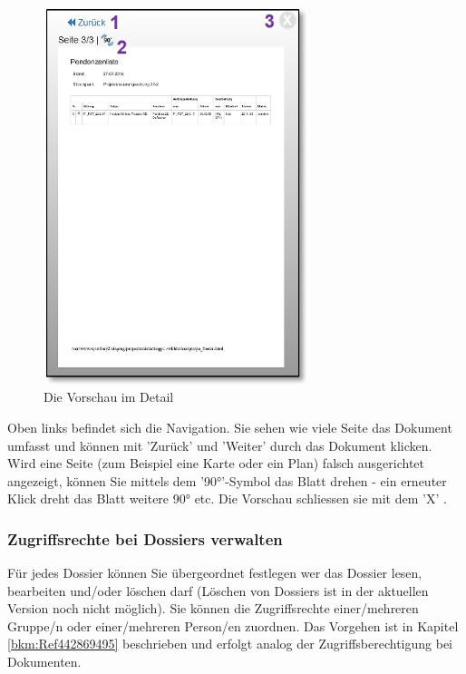 \begin{figure}   %
  \vspace{-30pt}      %
  \begin{center}
    \includegraphics[height=110mm]{../chapters/11_Dokumentenablage/pictures/11-1-2_VorschauDetails.jpg}
  \end{center}
  \vspace{-20pt}
  \caption{Die Vorschau im Detail}
  \vspace{-10pt}
\end{figure}
Oben links befindet sich die Navigation. Sie sehen wie viele Seite das Dokument umfasst und können mit 'Zurück' und 'Weiter'  durch das Dokument klicken. Wird eine Seite (zum Beispiel eine Karte oder ein Plan) falsch ausgerichtet angezeigt, können Sie mittels dem '90°'-Symbol das Blatt drehen - ein erneuter Klick dreht das Blatt weitere 90° etc. Die Vorschau schliessen sie mit dem 'X' .

\vspace{5cm}

\subsubsection{Zugriffsrechte bei Dossiers verwalten}
\label{bkm:Ref442273510}
Für jedes Dossier können Sie übergeordnet festlegen wer das Dossier lesen, bearbeiten und/oder löschen darf (Löschen von Dossiers ist in der aktuellen Version noch nicht möglich). Sie können die Zugriffsrechte einer/mehreren Gruppe/n oder einer/mehreren Person/en zuordnen. Das Vorgehen ist in Kapitel \ref{bkm:Ref442869495} beschrieben und erfolgt analog der Zugriffsberechtigung bei Dokumenten.

